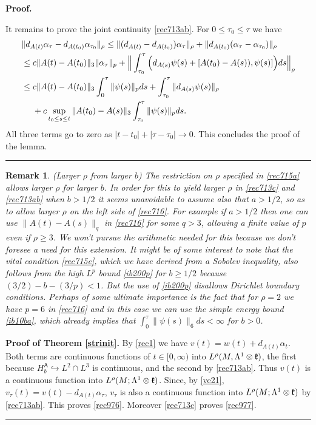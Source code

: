 \documentclass[12pt]{article}
\newtheorem{remark}[theorem]{Remark}
\newenvironment{proof}[1][Proof]{\textbf{#1.} }{\ \rule{0.5em}{0.5em}}
\def \L{\Lambda}
\def \({\Big(}
\def \){\Big)}
\def \As{\mathsf{A}}
\def \kf{\frak k}
\def \eref{\eqref}
\numberwithin{equation}{section}
\begin{document}
\begin{proof}
 
 It remains to prove the joint continuity \eref{rec713ab}. For $0 \le \tau_0 \le \tau$ we have
 \begin{align}
 &\|d_{A(t)} \alpha_\tau - d_{A(t_0)} \alpha_{\tau_0} \|_\rho
 \le \|(d_{A(t)} -d_{A(t_0)}) \alpha_\tau\|_\rho + \|d_{A(t_0)}(\alpha_\tau - \alpha_{\tau_0})\|_\rho \notag\\
 &\le c \| A(t) - A(t_0)\|_3 \|\alpha_\tau\|_p 
 +\Big\|\int_{\tau_0}^\tau \(d_{A(s)} \psi(s) +[ A(t_0) - A(s)), \psi(s)]\) ds\Big\|_{\rho} \notag \\
&\le c \| A(t) - A(t_0)\|_3  \int_0^\tau \| \psi(s)\|_p ds  +\int_{\tau_0}^\tau  \|d_{A(s)} \psi(s)\|_\rho  \notag\\
& \ \ \ \   +c\sup_{t_0 \le s \le t} \|A(t_0 ) - A(s)\|_3 \int_{\tau_0}^\tau \|\psi(s)\|_p ds.  \notag
 \end{align}
 All three terms go to zero as $|t-t_0| + |\tau - \tau_0| \rightarrow 0$. This concludes the proof of the lemma.
  \end{proof}


\begin{remark}{\rm  (Larger $\rho$ from larger $b$)
The restriction on $\rho$ specified in \eref{rec715a} allows larger $\rho$  for larger $b$. 
In order for this to yield larger $\rho$ in \eref{rec713c} and \eref{rec713ab}  
when $b > 1/2$  it seems
unavoidable  to assume also that $a > 1/2$, so as to allow larger $\rho$ on the left side of \eref{rec716}. 
 For example if $a > 1/2$ then one can use $\|A(t) - A(s)\|_q$ 
 in \eref{rec716} for some $q >3$,  allowing a finite value of $p$ even if $\rho \ge 3$. We won't pursue
 the arithmetic needed for this because we don't foresee a need for this  extension.
 It might be of some interest to note that the vital condition \eref{rec715e}, which we have derived 
 from a Sobolev inequality, also follows from the high $L^p$ bound \eref{ib200p} for $b \ge 1/2$ 
 because  $(3/2) - b - (3/p) < 1$.
 But the use of \eref{ib200p}  disallows Dirichlet  boundary conditions. 
 Perhaps of some ultimate importance is the fact that for $\rho=2$ we have $p =6$ in \eref{rec716}
 and in this case we  
 can use  the simple energy bound \eref{ib10ba}, which already implies that
 $\int_0^\tau \|\psi(s)\|_6 ds < \infty$ for $b >0$.
}
\end{remark}


 

\bigskip
\noindent
\begin{proof}[Proof of Theorem \ref{strinit}] By \eref{rec1} we have $v(t) = w(t) + d_{A(t)}\alpha_t$.
Both terms are continuous functions of $t \in [0,\infty)$  into $L^\rho(M, \L^1\otimes \kf)$, the first because
$H_b^\As \hookrightarrow L^2 \cap L^3$ is continuous,  and the second  by  \eref{rec713ab}. Thus $v(t)$ is a continuous function into $L^\rho(M; \L^1\otimes \kf)$. Since, by \eref{ve21}, 
 $v_\tau(t) = v(t) - d_{A(t)}\alpha_\tau$, $v_\tau$ is also a continuous function
  into $L^\rho(M;\L^1\otimes \kf)$ by \eref{rec713ab}. 
  This proves \eref{rec976}. Moreover \eref{rec713c} proves \eref{rec977}.
\end{proof}
\end{document}
